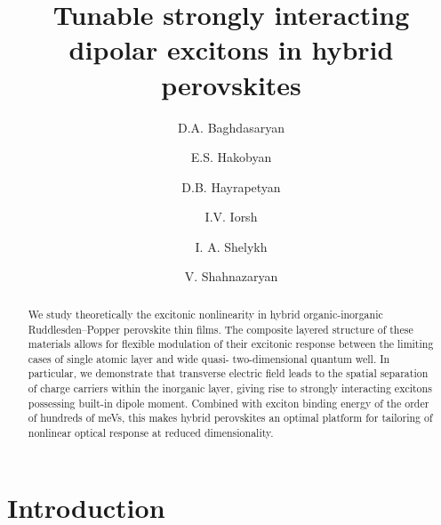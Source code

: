 \documentclass[prb,twocolumn,preprintnumbers,superscriptaddress]{revtex4}
\begin{document}
\title{Tunable strongly interacting dipolar excitons in hybrid perovskites}

\author{D.A. Baghdasaryan}

\author{E.S. Hakobyan}

\author{D.B. Hayrapetyan}

\author{I.V. Iorsh}

\author{I. A. Shelykh}

\author{V. Shahnazaryan}



\begin{abstract}
We study theoretically the excitonic nonlinearity in hybrid organic-inorganic Ruddlesden–Popper perovskite thin films. 
The composite layered structure of these materials allows for flexible modulation of their excitonic response between the limiting cases of single atomic layer and wide quasi- two-dimensional quantum well.
In particular, we demonstrate that transverse electric field leads to the spatial separation of charge carriers within the inorganic layer, giving rise to strongly interacting excitons possessing built-in dipole moment. Combined with exciton binding energy of the order of hundreds of meVs, this makes hybrid perovskites  an optimal platform for tailoring of nonlinear optical response at reduced dimensionality. 


 
\end{abstract}

\maketitle

\medskip



\section{Introduction}
\end{document}

